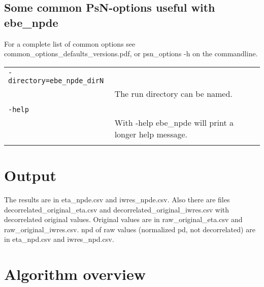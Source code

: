 \documentclass[a4paper,12pt]{article}
\begin{document}
\subsection{Some common PsN-options useful with ebe\_npde}

For a complete list of common options see common\_options\_defaults\_versions.pdf, or psn\_options -h on the commandline.

\begin{longtable}{p{1in}p{4in}}
\verb|-directory=ebe_npde_dirN| & \\
\nopagebreak
 & The run directory can be named.  \\
\\
\verb|-help| & \\
\nopagebreak
 & With -help ebe\_npde will print a longer help message. \\
\\
\end{longtable}


\section{Output}

The results are in eta\_npde.csv and iwres\_npde.csv. Also there are files decorrelated\_original\_eta.csv and decorrelated\_original\_iwres.csv with decorrelated original values. Original values are in raw\_original\_eta.csv and raw\_original\_iwres.csv. npd of raw values (normalized pd, not decorrelated) are in eta\_npd.csv and iwres\_npd.csv.

\section{Algorithm overview}
\end{document}
